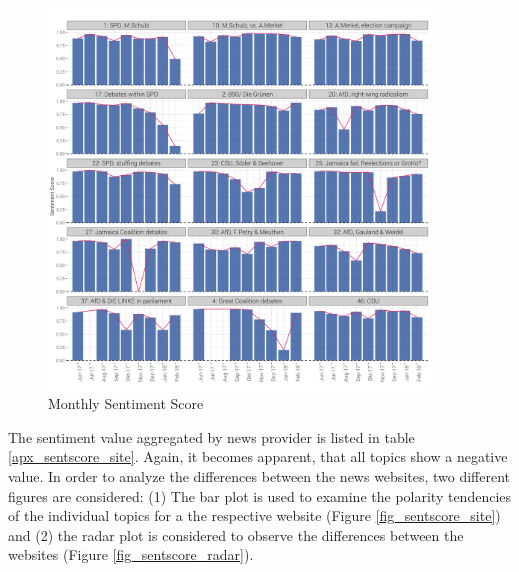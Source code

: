 \documentclass[12pt,a4paper,notitlepage]{article}
\begin{document}
\begin{figure}[H]
	\caption{Monthly Sentiment Score}
		\begin{center}
			\includegraphics[width=0.9\textwidth,keepaspectratio]{figs/sentscore_monthly.png}
		\end{center}
	\label{fig_sentscore_monthly}
\end{figure}

The sentiment value aggregated by news provider is listed in table \ref{apx_sentscore_site}. Again, it becomes apparent, that all topics show a negative value. In order to analyze the differences between the news websites, two different figures are considered: (1) The bar plot is used to examine the polarity tendencies of the individual topics for a the respective website (Figure \ref{fig_sentscore_site}) and (2) the radar plot is considered to observe the differences between the websites (Figure \ref{fig_sentscore_radar}).
\end{document}
